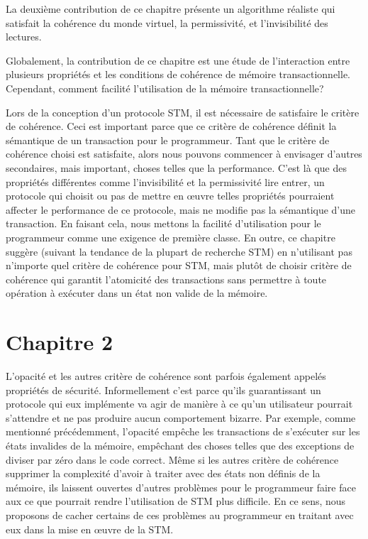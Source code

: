La deuxième contribution de ce chapitre présente un algorithme réaliste qui satisfait la cohérence du monde virtuel, la permissivité, et l'invisibilité des lectures.

Globalement, la contribution de ce chapitre est une étude de l'interaction entre plusieurs propriétés et les conditions de cohérence de mémoire transactionnelle.
Cependant, comment facilité l'utilisation de la mémoire transactionnelle?




Lors de la conception d'un protocole STM, il est nécessaire de satisfaire le critère de cohérence.
Ceci est important parce que ce critère de cohérence définit la sémantique de un transaction pour le programmeur.
Tant que le critère de cohérence choisi est satisfaite, alors nous pouvons commencer à envisager d'autres secondaires,
mais important, choses telles que la performance.
C'est là que des propriétés différentes comme l'invisibilité et la permissivité lire entrer,
un protocole qui choisit ou pas de mettre en œuvre telles propriétés pourraient affecter le performance de ce protocole, mais ne modifie pas la sémantique d'une transaction.
En faisant cela, nous mettons la facilité d'utilisation pour le programmeur comme une exigence de première classe.
En outre, ce chapitre suggère (suivant la tendance de la plupart de recherche STM) en n'utilisant pas n'importe quel critère de cohérence pour STM,
mais plutôt de choisir critère de cohérence qui garantit l'atomicité des transactions sans permettre à toute opération à exécuter dans un état non valide de la mémoire.




\section*{Chapitre 2}

L'opacité et les autres critère de cohérence sont parfois également appelés propriétés de sécurité.
Informellement c'est parce qu'ils guarantissant un protocole qui eux implémente va
agir de manière à ce qu'un utilisateur pourrait s'attendre et ne pas produire aucun comportement bizarre.
Par exemple, comme mentionné précédemment, l'opacité empêche les transactions de s'exécuter sur les états invalides de la mémoire, empêchant
des choses telles que des exceptions de diviser par zéro dans le code correct.
Même si les autres critère de cohérence supprimer la complexité d'avoir à traiter avec des états non définis de la mémoire,
ils laissent ouvertes d'autres problèmes pour le programmeur faire face aux ce que pourrait rendre l'utilisation de STM plus difficile.
En ce sens, nous proposons de cacher certains de ces problèmes au programmeur en traitant avec eux dans la mise en œuvre de la STM.


